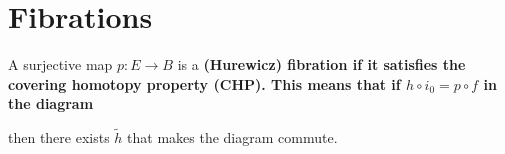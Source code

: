 











\chapter{Fibrations}

A surjective map $p: E \longrightarrow B$ is a \bf{(Hurewicz) fibration} if it satisfies the \bf{covering homotopy property} (CHP). This means that if $h \circ i_0=p \circ f$ in the diagram
\begin{center}
\end{center}    
then there exists $\tilde{h}$ that makes the diagram commute.

